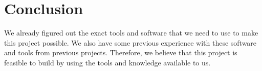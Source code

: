 \documentclass[journal, 12pt]{IEEEtran}
\begin{document}
\section{Conclusion} 
We already figured out the exact tools and software that we need to use to make this project possible. We also have some previous experience with these software and tools from previous projects. Therefore, we believe that this project is feasible to build by using the tools and knowledge available to us.




\printbibliography
\end{document}
